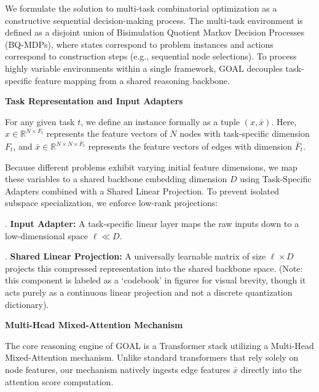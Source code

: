 \noindent We formulate the solution to multi-task combinatorial optimization as a constructive sequential decision-making process. The multi-task environment is defined as a disjoint union of Bisimulation Quotient Markov Decision Processes (BQ-MDPs), where states correspond to problem instances and actions correspond to construction steps (e.g., sequential node selections). To process highly variable environments within a single framework, GOAL decouples task-specific feature mapping from a shared reasoning backbone.

\vspace{1em}
\noindent\textbf{Task Representation and Input Adapters}
\vspace{0.5em}

\noindent For any given task $t$, we define an instance formally as a tuple $(x, \bar{x})$. Here, $x \in \mathbb{R}^{N \times F_t}$ represents the feature vectors of $N$ nodes with task-specific dimension $F_t$, and $\bar{x} \in \mathbb{R}^{N \times N \times \bar{F}_t}$ represents the feature vectors of edges with dimension $\bar{F}_t$. 

\vspace{0.5em}
\noindent Because different problems exhibit varying initial feature dimensions, we map these variables to a shared backbone embedding dimension $D$ using Task-Specific Adapters combined with a Shared Linear Projection. To prevent isolated subspace specialization, we enforce low-rank projections:

\vspace{0.5em}
. \textbf{Input Adapter:} A task-specific linear layer maps the raw inputs down to a low-dimensional space $\ell \ll D$.

\vspace{0.5em}
. \textbf{Shared Linear Projection:} A universally learnable matrix of size $\ell \times D$ projects this compressed representation into the shared backbone space. (Note: this component is labeled as a `codebook' in figures for visual brevity, though it acts purely as a continuous linear projection and not a discrete quantization dictionary).

\vspace{1em}
\noindent\textbf{Multi-Head Mixed-Attention Mechanism}
\vspace{0.5em}

\noindent The core reasoning engine of GOAL is a Transformer stack utilizing a Multi-Head Mixed-Attention mechanism. Unlike standard transformers that rely solely on node features, our mechanism natively ingests edge features $\bar{x}$ directly into the attention score computation. 

